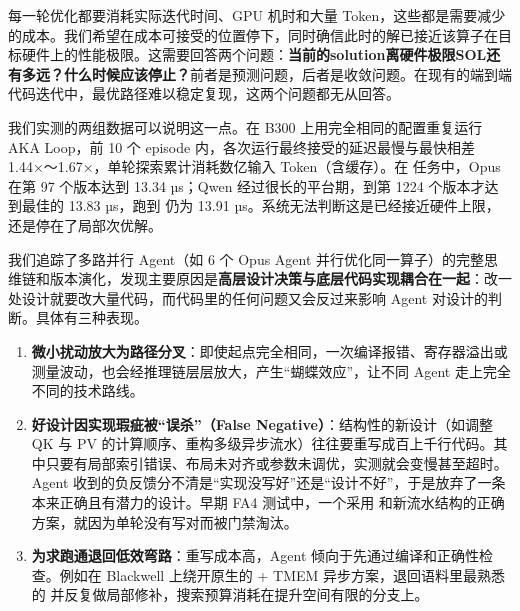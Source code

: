 每一轮优化都要消耗实际迭代时间、GPU 机时和大量 Token，这些都是需要减少的成本。我们希望在成本可接受的位置停下，同时确信此时的解已接近该算子在目标硬件上的性能极限。这需要回答两个问题：\textbf{当前的solution离硬件极限SOL还有多远？什么时候应该停止？}前者是预测问题，后者是收敛问题。在现有的端到端代码迭代中，最优路径难以稳定复现，这两个问题都无从回答。


我们实测的两组数据可以说明这一点。在 B300 上用完全相同的配置重复运行 AKA Loop，前 10 个 episode 内，各次运行最终接受的延迟最慢与最快相差 1.44×～1.67×，单轮探索累计消耗数亿输入 Token（含缓存）。在  任务中，Opus 在第 97 个版本达到 13.34 µs；Qwen 经过很长的平台期，到第 1224 个版本才达到最佳的 13.83 µs，跑到  仍为 13.91 µs。系统无法判断这是已经接近硬件上限，还是停在了局部次优解。


\begin{DiagramBlock}
\end{DiagramBlock}
我们追踪了多路并行 Agent（如 6 个 Opus Agent 并行优化同一算子）的完整思维链和版本演化，发现主要原因是\textbf{高层设计决策与底层代码实现耦合在一起}：改一处设计就要改大量代码，而代码里的任何问题又会反过来影响 Agent 对设计的判断。具体有三种表现。


\begin{enumerate}[start=1]
\item
\textbf{微小扰动放大为路径分叉}：即使起点完全相同，一次编译报错、寄存器溢出或测量波动，也会经推理链层层放大，产生“蝴蝶效应”，让不同 Agent 走上完全不同的技术路线。


\item
\textbf{好设计因实现瑕疵被“误杀”（False Negative）}：结构性的新设计（如调整 QK 与 PV 的计算顺序、重构多级异步流水）往往要重写成百上千行代码。其中只要有局部索引错误、布局未对齐或参数未调优，实测就会变慢甚至超时。Agent 收到的负反馈分不清是“实现没写好”还是“设计不好”，于是放弃了一条本来正确且有潜力的设计。早期 FA4 测试中，一个采用  和新流水结构的正确方案，就因为单轮没有写对而被门禁淘汰。


\item
\textbf{为求跑通退回低效弯路}：重写成本高，Agent 倾向于先通过编译和正确性检查。例如在 Blackwell 上绕开原生的  + TMEM 异步方案，退回语料里最熟悉的  并反复做局部修补，搜索预算消耗在提升空间有限的分支上。


\end{enumerate}
\SourceSeparator
